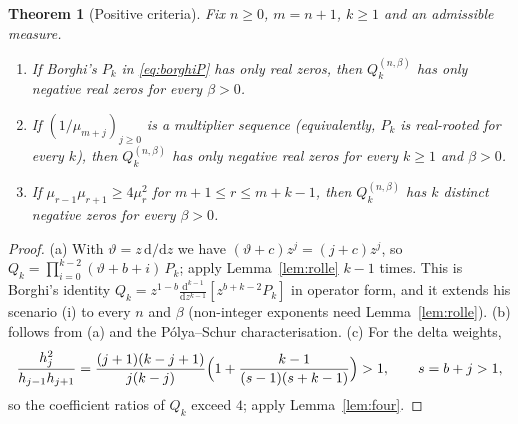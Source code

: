 \documentclass[11pt,a4paper]{article}
\newtheorem{theorem}{Theorem}[section]
\theoremstyle{definition}
\theoremstyle{remark}
\begin{document}
\begin{theorem}[Positive criteria]\label{thm:positive}
Fix $n\ge0$, $m=n+1$, $k\ge1$ and an admissible measure.
\begin{enumerate}
\item[(a)] If Borghi's $P_k$ in \eqref{eq:borghiP} has only real zeros,
then $Q_k^{(n,\beta)}$ has only negative real zeros for every $\beta>0$.
\item[(b)] If $(1/\mu_{m+j})_{j\ge0}$ is a multiplier sequence (equivalently,
$P_k$ is real-rooted for every $k$), then $Q_k^{(n,\beta)}$ has only negative
real zeros for every $k\ge1$ and $\beta>0$.
\item[(c)] If $\mu_{r-1}\mu_{r+1}\ge4\mu_r^2$ for $m+1\le r\le m+k-1$, then
$Q_k^{(n,\beta)}$ has $k$ distinct negative zeros for every $\beta>0$.
\end{enumerate}
\end{theorem}
\begin{proof}
(a) With $\vartheta=z\,\mathrm d/\mathrm dz$ we have
$(\vartheta+c)z^j=(j+c)z^j$, so
$Q_k=\prod_{i=0}^{k-2}(\vartheta+b+i)\,P_k$; apply Lemma~\ref{lem:rolle}
$k-1$ times. This is Borghi's identity
$Q_k=z^{1-b}\frac{\mathrm d^{k-1}}{\mathrm dz^{k-1}}[z^{b+k-2}P_k]$ in operator form, and
it extends his scenario (i) to every $n$ and $\beta$ (non-integer
exponents need Lemma~\ref{lem:rolle}).
(b) follows from (a) and the Pólya--Schur characterisation.
(c) For the delta weights,
\[
 \frac{h_j^2}{h_{j-1}h_{j+1}}=\frac{(j+1)(k-j+1)}{j(k-j)}
 \Bigl(1+\frac{k-1}{(s-1)(s+k-1)}\Bigr)>1,\qquad s=b+j>1,
\]
so the coefficient ratios of $Q_k$ exceed $4$; apply Lemma~\ref{lem:four}.
\end{proof}
\end{document}
